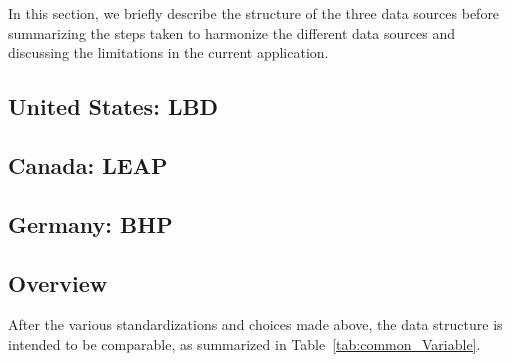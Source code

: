 
In this section, we briefly describe the structure of the three data sources before summarizing the steps taken to harmonize the different data sources and discussing the limitations in the current application.

\subsection{United States: \acf{LBD}}



\subsection{Canada: \acf{LEAP}}



\subsection{Germany: \acf{BHP}}



\subsection{Overview}

After the various standardizations and choices made above, the data structure is intended to be comparable, as summarized in Table~\ref{tab:common_Variable}.

%

